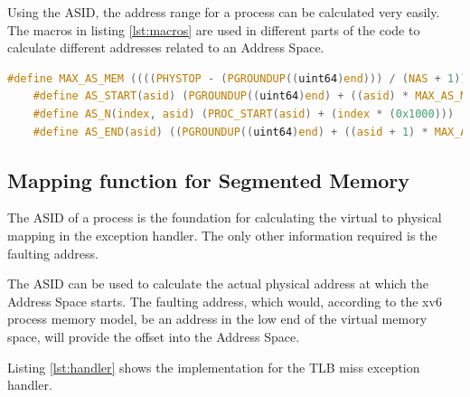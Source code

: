 Using the ASID, the address range for a process can be calculated very easily. The macros in listing \ref{lst:macros}
are used in different parts of the code to calculate different addresses related to an Address Space.

\begin{lstlisting}[language=c,float=h!,
    label={lst:macros}]
    #define MAX_AS_MEM ((((PHYSTOP - (PGROUNDUP((uint64)end))) / (NAS + 1)) >> 12 )<< 12)
    #define AS_START(asid) (PGROUNDUP((uint64)end) + ((asid) * MAX_AS_MEM))
    #define AS_N(index, asid) (PROC_START(asid) + (index * (0x1000)))
    #define AS_END(asid) ((PGROUNDUP((uint64)end) + ((asid + 1) * MAX_AS_MEM))-0x1000)
\end{lstlisting}

\subsection{Mapping function for Segmented Memory}
The ASID of a process is the foundation for calculating the virtual to physical mapping in the exception handler.
The only other information required is the faulting address.

The ASID can be used to calculate the actual physical address at which the Address Space starts.
The faulting address, which would, according to the xv6 process memory model, be an address in the low
end of the virtual memory space, will provide the offset into the Address Space.

Listing \ref{lst:handler} shows the implementation for the TLB miss exception handler.

